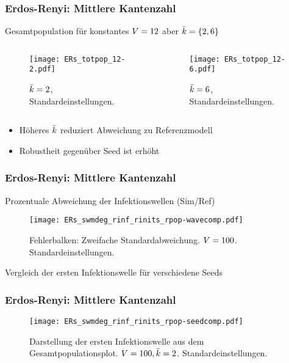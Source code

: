 \begin{frame}[t]
    \frametitle{Erdos-Renyi: Mittlere Kantenzahl}
    Gesamtpopulation für konstantes $V = 12$ aber $\bar{k} = \{2, 6\}$
    \begin{columns}
        \begin{column}{0.5\textwidth}
            \begin{figure}[htpb]
                \centering
                \texttt{[image: ERs\_totpop\_12-2.pdf]}
                \caption{$\bar{k} = 2$, Standardeinstellungen.}
                \label{fig:ERs_totpop_12-2}
            \end{figure}
        \end{column}
        \begin{column}{0.5\textwidth}
            \begin{figure}[htpb]
                \centering
                \texttt{[image: ERs\_totpop\_12-6.pdf]}
                \caption{$\bar{k} = 6$, Standardeinstellungen.}
                \label{fig:ERs_totpop_12-6}
            \end{figure}
        \end{column}
    \end{columns}
    \begin{itemize}
        \item Höheres $\bar{k}$ reduziert Abweichung zu Referenzmodell
        \item Robustheit gegenüber Seed ist erhöht
    \end{itemize}
\end{frame}

\begin{frame}[t]
    \frametitle{Erdos-Renyi: Mittlere Kantenzahl}
    Prozentuale Abweichung der Infektionswellen (Sim/Ref)
    \begin{figure}[htpb]
        \centering
        \texttt{[image: ERs\_swmdeg\_rinf\_rinits\_rpop-wavecomp.pdf]}
        \caption{Fehlerbalken: Zweifache Standardabweichung. $V = 100$. Standardeinstellungen.}%
        \label{fig:ERs_swmean_finf_rinit_rpop-wavecomp}
    \end{figure}
\end{frame}
\begin{frame}[t]
    Vergleich der ersten Infektionswelle für verschiedene Seeds
    \frametitle{Erdos-Renyi: Mittlere Kantenzahl}
    \begin{figure}[htpb]
        \centering
        \texttt{[image: ERs\_swmdeg\_rinf\_rinits\_rpop-seedcomp.pdf]}
        \caption{Darstellung der ersten Infektionswelle aus dem Gesamtpopulationsplot. $V = 100, \bar{k}=2$.
        Standardeinstellungen.}%
        \label{fig:ERs_swmdeg_rinf_rinits_rpop-seedcomp}
    \end{figure}
\end{frame}

